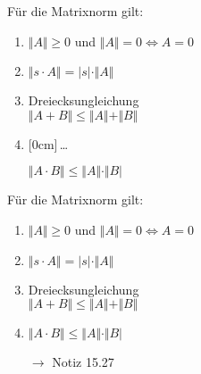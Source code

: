 \documentclass[11pt]{article}
\renewcommand{\cite}[1]{\par\bigskip\hfill{\color{gray}\tiny\(\to\) #1}}
\renewcommand{\leq}{\leqslant}
\renewcommand{\geq}{\geqslant}
\newcommand{\hide}[1]{\parbox{0cm}{\raisebox{-7pt}[0cm]{\dots}}\color{white}#1\color{black}}
\let\olddots\dots
\renewcommand{\dots}{\,\olddots\,}
\newenvironment{field}{}{\newpage}
\newif\ifnote
\newenvironment{note}{\notetrue}{\notefalse}
\begin{document}
\begin{note}
    \begin{field}
        Für die Matrixnorm gilt:
        \begin{enumerate}[(1)]
            \item $\Vert A \Vert \geq 0$ und $\Vert A \Vert = 0 \Leftrightarrow A = 0$
            \item $\Vert s\cdot A\Vert = \vert s \vert\cdot\Vert A \Vert$
            \item Dreiecksungleichung\\
            $\Vert A+B\Vert \leq \Vert A\Vert+\Vert B \Vert$
            \item \hide{$\Vert A\cdot B\Vert \leq \Vert A\Vert\cdot\Vert B \vert$}
        \end{enumerate}
    \end{field}
    \begin{field}
        Für die Matrixnorm gilt:
        \begin{enumerate}[(1)]
            \item $\Vert A \Vert \geq 0$ und $\Vert A \Vert = 0 \Leftrightarrow A = 0$
            \item $\Vert s\cdot A\Vert = \vert s \vert\cdot\Vert A \Vert$
            \item Dreiecksungleichung\\
            $\Vert A+B\Vert \leq \Vert A\Vert+\Vert B \Vert$
            \item $\Vert A\cdot B\Vert \leq \Vert A\Vert\cdot\Vert B \vert$
            \cite{Notiz 15.27}
        \end{enumerate}
    \end{field}
\end{note}
\end{document}

